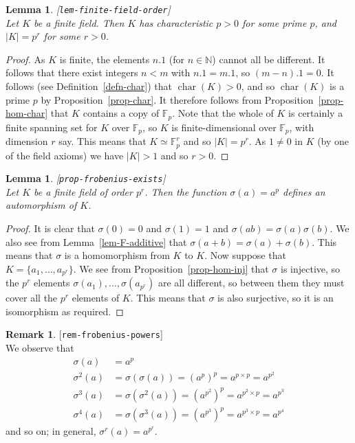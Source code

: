 \documentclass{amsart}
\newcommand{\lbl}[1]{\label{#1}\textup{[\texttt{#1}]}\ \\}
\newcommand{\lbl}{\label}
\newcommand{\chr}       {\operatorname{char}}
\newcommand{\N}         {{\mathbb{N}}}
\newcommand{\F}         {{\mathbb{F}}}
\newcommand{\sg}        {\sigma}
\newcommand{\tm}        {\times}
\renewcommand{\:}{\colon}
\newtheorem{lemma}[theorem]{Lemma}
\theoremstyle{definition}
\newtheorem{remark}[theorem]{Remark}
\begin{document}
\begin{lemma}\lbl{lem-finite-field-order}
 Let $K$ be a finite field.  Then $K$ has characteristic $p>0$ for
 some prime $p$, and $|K|=p^r$ for some $r>0$.
\end{lemma}
\begin{proof}
 As $K$ is finite, the elements $n.1$ (for $n\in\N$) cannot all be
 different.  It follows that there exist integers $n<m$ with
 $n.1=m.1$, so $(m-n).1=0$.  It follows (see
 Definition~\ref{defn-char}) that $\chr(K)>0$, and so $\chr(K)$ is a
 prime $p$ by Proposition~\ref{prop-char}.  It therefore follows from
 Proposition~\ref{prop-hom-char} that $K$ contains a copy of $\F_p$.
 Note that the whole of $K$ is certainly a finite spanning set for $K$
 over $\F_p$, so $K$ is finite-dimensional over $\F_p$, with dimension
 $r$ say.  This means that $K\simeq\F_p^r$ and so $|K|=p^r$.  As
 $1\neq 0$ in $K$ (by one of the field axioms) we have $|K|>1$ and so
 $r>0$. 
\end{proof}

\begin{lemma}\lbl{prop-frobenius-exists}
 Let $K$ be a finite field of order $p^r$.  Then the function
 $\sg(a)=a^p$ defines an automorphism of $K$.
\end{lemma}
\begin{proof}
 It is clear that $\sg(0)=0$ and $\sg(1)=1$ and
 $\sg(ab)=\sg(a)\sg(b)$.  We also see from Lemma~\ref{lem-F-additive}
 that $\sg(a+b)=\sg(a)+\sg(b)$.  This means that $\sg$ is a
 homomorphism from $K$ to $K$.  Now suppose that
 $K=\{a_1,\dotsc,a_{p^r}\}$.  We see from
 Proposition~\ref{prop-hom-inj} that $\sg$ is injective, so the $p^r$
 elements $\sg(a_1),\dotsc,\sg(a_{p^r})$ are all different, so between
 them they must cover all the $p^r$ elements of $K$.  This means that
 $\sg$ is also surjective, so it is an isomorphism as required.
\end{proof}

\begin{remark}\lbl{rem-frobenius-powers}
 We observe that
 \begin{align*}
  \sg(a) &= a^p \\
  \sg^2(a) &= \sg(\sg(a)) = (a^p)^p = a^{p\tm p} = a^{p^2} \\
  \sg^3(a) &= \sg(\sg^2(a)) = (a^{p^2})^p = a^{p^2\tm p} = a^{p^3} \\
  \sg^4(a) &= \sg(\sg^3(a)) = (a^{p^3})^p = a^{p^3\tm p} = a^{p^4}
 \end{align*}
 and so on; in general, $\sg^r(a)=a^{p^r}$.  
\end{remark}
\end{document}
